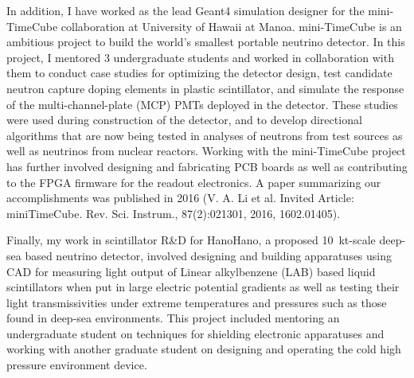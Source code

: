 \documentclass[10pt]{article} %
\begin{document}
In addition, I have worked as the lead Geant4 simulation designer for the
mini-TimeCube collaboration at University of Hawaii at Manoa. mini-TimeCube is
an ambitious project to build the world's smallest portable neutrino detector.
In this project, I mentored 3 undergraduate students and worked in
collaboration with them to conduct case studies for optimizing the detector
design, test candidate neutron capture doping elements in plastic scintillator,
and simulate the response of the multi-channel-plate (MCP) PMTs deployed in the
detector. These studies were used during construction of the detector, and to
develop directional algorithms that are now being tested in analyses of
neutrons from test sources as well as neutrinos from nuclear reactors.
Working with the mini-TimeCube project has further involved designing and
fabricating PCB boards as well as contributing to the FPGA firmware for the
readout electronics. A paper summarizing our accomplishments was published in
2016 (V. A. Li et al. Invited Article: miniTimeCube. Rev. Sci. Instrum.,
87(2):021301, 2016, 1602.01405).

Finally, my work in scintillator R\&D for HanoHano, a proposed
\SI{10}{\kilo\tonne}-scale deep-sea based neutrino detector, involved designing
and building apparatuses using CAD for measuring light output of Linear
alkylbenzene (LAB) based liquid scintillators when put in large electric
potential gradients as well as testing their light transmissivities under
extreme temperatures and pressures such as those found in deep-sea
environments. This project included mentoring an undergraduate student on
techniques for shielding electronic apparatuses and working with another
graduate student on designing and operating the cold high pressure environment
device.


\end{document}
